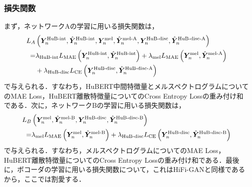 \documentclass[12pt]{jarticle}
\numberwithin{equation}{section}    %
\numberwithin{figure}{section}      %
\numberwithin{table}{section}      %
\begin{document}
\subsubsection{損失関数}
まず，ネットワークAの学習に用いる損失関数は，
\begin{equation}
    \begin{aligned}
        L_{A} & \left(\bm{Y}^{\text{HuB-int}}_{n}, \hat{\bm{Y}}^{\text{HuB-int}}_{n}, \bm{Y}^{\text{mel}}_{n}, \hat{\bm{Y}}^{\text{mel-A}}_{n}, \bm{Y}^{\text{HuB-disc}}_{n}, \hat{\bm{Y}}^{\text{HuB-disc-A}}_{n}\right)                 \\
        =                  & \lambda_{\text{HuB-int}} L_{\text{MAE}}\left(\bm{Y}^{\text{HuB-int}}_{n}, \hat{\bm{Y}}^{\text{HuB-int}}_{n}\right) + \lambda_{\text{mel}} L_{\text{MAE}}\left(\bm{Y}^{\text{mel}}_{n}, \hat{\bm{Y}}^{\text{mel-A}}_{n}\right) \\
                           & + \lambda_{\text{HuB-disc}} L_{\text{CE}}\left(\bm{Y}^{\text{HuB-disc}}_{n}, \hat{\bm{Y}}^{\text{HuB-disc-A}}_{n}\right)
    \end{aligned}
\end{equation}
で与えられる．すなわち，HuBERT中間特徴量とメルスペクトログラムについてのMAE Loss，HuBERT離散特徴量についてのCross Entropy Lossの重み付け和である．次に，ネットワークBの学習に用いる損失関数は，
\begin{equation}
    \begin{aligned}
        L_{B} & \left(\bm{Y}^{\text{mel}}_{n}, \hat{\bm{Y}}^{\text{mel-B}}_{n}, \bm{Y}^{\text{HuB-disc}}_{n}, \hat{\bm{Y}}^{\text{HuB-disc-B}}_{n}\right)                                                  \\
        =                  & \lambda_{\text{mel}} L_{\text{MAE}}\left(\bm{Y}^{\text{mel}}_{n}, \hat{\bm{Y}}^{\text{mel-B}}_{n}\right) + \lambda_{\text{HuB-disc}} L_{\text{CE}}\left(\bm{Y}^{\text{HuB-disc}}_{n}, \hat{\bm{Y}}^{\text{HuB-disc-B}}_{n}\right)
    \end{aligned}
\end{equation}
で与えられる．すなわち，メルスペクトログラムについてのMAE Loss，HuBERT離散特徴量についてのCross Entropy Lossの重み付け和である．最後に，ボコーダの学習に用いる損失関数について，これはHiFi-GANと同様であるから，ここでは割愛する．
\end{document}
